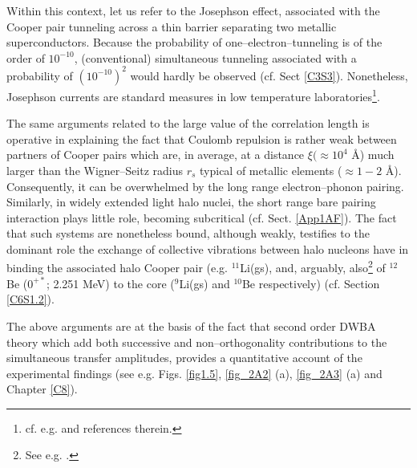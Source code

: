 Within this context, let us refer to the Josephson effect, associated with the Cooper pair tunneling across a thin barrier separating two metallic superconductors. Because the probability of one--electron--tunneling is of the order of $10^{-10}$, (conventional) simultaneous tunneling associated with a probability of $(10^{-10})^2$ would hardly be observed (cf. Sect \ref{C3S3}). Nonetheless, Josephson currents are standard measures in low temperature laboratories\footnote{cf. e.g. \cite{Rogalla:12} and references therein.}.


The same arguments related  to the large value of the correlation length is operative in explaining the fact that Coulomb repulsion is rather weak between partners of Cooper pairs which are, in average, at a distance $\xi (\approx 10^{4}$ \AA{}) much larger than the Wigner--Seitz radius $r_s$ typical of metallic elements ($\approx 1-2$ \AA{}). Consequently, it can be overwhelmed by the long range electron--phonon pairing. Similarly, in widely extended light halo nuclei, the short range bare pairing interaction plays little role, becoming subcritical (cf. Sect. \ref{App1AF}). The fact that such systems are nonetheless bound, although weakly, testifies to the dominant role the exchange of collective vibrations between halo nucleons have in binding the associated halo Cooper pair (e.g. $^{11}$Li(gs), and, arguably, also\footnote{See e.g. \cite{Johansen:13}.} of $^{12}$Be ($0^{+*}$; 2.251 MeV) to the core ($^{9}$Li(gs) and $^{10}$Be respectively) (cf. Section \ref{C6S1.2}).


The above arguments are at the basis of the fact that second order DWBA theory which add both successive and non--orthogonality contributions to the simultaneous transfer amplitudes, provides a quantitative account of the experimental findings (see e.g. Figs. \ref{fig1.5}, \ref{fig_2A2} (a), \ref{fig_2A3} (a) and Chapter  \ref{C8}).

